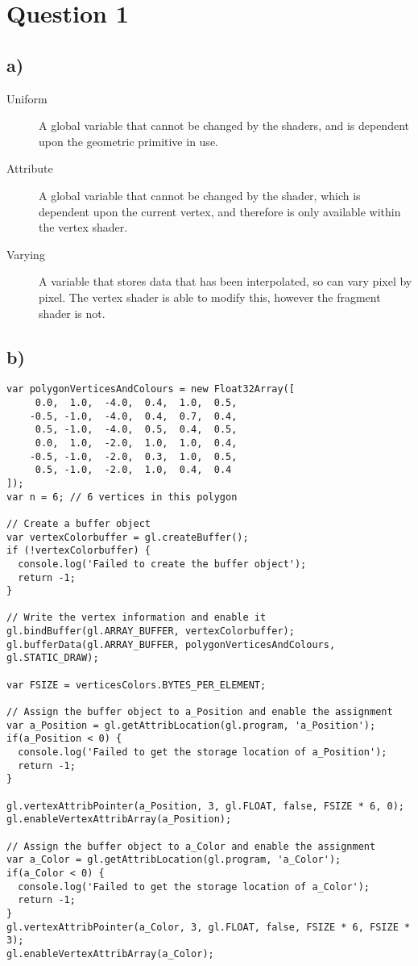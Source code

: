 \documentclass[a4paper,12pt]{article}
\begin{document}
\section*{Question 1}
\subsection*{a)}
\begin{description}
    \item[Uniform]
    A global variable that cannot be changed by the shaders, and is dependent upon the geometric primitive in use.
    \item[Attribute]
    A global variable that cannot be changed by the shader, which is dependent upon the current vertex, and therefore is only available within the vertex shader.
    \item[Varying]
    A variable that stores data that has been interpolated, so can vary pixel by pixel. The vertex shader is able to modify this, however the fragment shader is not.
\end{description}

\subsection*{b)}
\begin{lstlisting}[title=Colour and vertices in same array]
var polygonVerticesAndColours = new Float32Array([
     0.0,  1.0,  -4.0,  0.4,  1.0,  0.5,
    -0.5, -1.0,  -4.0,  0.4,  0.7,  0.4,
     0.5, -1.0,  -4.0,  0.5,  0.4,  0.5,
     0.0,  1.0,  -2.0,  1.0,  1.0,  0.4,
    -0.5, -1.0,  -2.0,  0.3,  1.0,  0.5,
     0.5, -1.0,  -2.0,  1.0,  0.4,  0.4
]);
var n = 6; // 6 vertices in this polygon

// Create a buffer object
var vertexColorbuffer = gl.createBuffer();
if (!vertexColorbuffer) {
  console.log('Failed to create the buffer object');
  return -1;
}

// Write the vertex information and enable it
gl.bindBuffer(gl.ARRAY_BUFFER, vertexColorbuffer);
gl.bufferData(gl.ARRAY_BUFFER, polygonVerticesAndColours, gl.STATIC_DRAW);

var FSIZE = verticesColors.BYTES_PER_ELEMENT;

// Assign the buffer object to a_Position and enable the assignment
var a_Position = gl.getAttribLocation(gl.program, 'a_Position');
if(a_Position < 0) {
  console.log('Failed to get the storage location of a_Position');
  return -1;
}

gl.vertexAttribPointer(a_Position, 3, gl.FLOAT, false, FSIZE * 6, 0);
gl.enableVertexAttribArray(a_Position);

// Assign the buffer object to a_Color and enable the assignment
var a_Color = gl.getAttribLocation(gl.program, 'a_Color');
if(a_Color < 0) {
  console.log('Failed to get the storage location of a_Color');
  return -1;
}
gl.vertexAttribPointer(a_Color, 3, gl.FLOAT, false, FSIZE * 6, FSIZE * 3);
gl.enableVertexAttribArray(a_Color);
\end{lstlisting}
\end{document}
